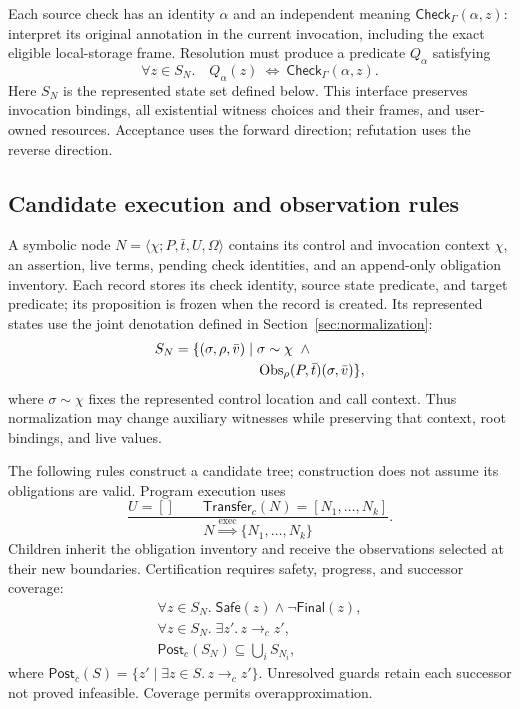 Each source check has an identity $\alpha$ and an independent meaning
$\mathsf{Check}_\Gamma(\alpha,z)$: interpret its original annotation in the
current invocation, including the exact eligible local-storage frame.
Resolution must produce a predicate $Q_\alpha$ satisfying
\begin{equation}
\label{eq:resolution}
 \forall z\in S_N.\quad
 Q_\alpha(z)\ \Longleftrightarrow\ \mathsf{Check}_\Gamma(\alpha,z).
\end{equation}
Here $S_N$ is the represented state set defined below. This interface
preserves invocation bindings, all existential witness choices and their
frames, and user-owned resources. Acceptance uses the forward direction;
refutation uses the reverse direction.

\subsection{Candidate execution and observation rules}
A symbolic node $N=\langle\chi;P,\bar t,U,\Omega\rangle$ contains its control and invocation context $\chi$, an assertion,
live terms, pending check identities, and an append-only obligation inventory. Each record stores its check identity, source state predicate, and target predicate; its proposition is frozen when the record is created.
Its represented states use the joint denotation defined in
Section~\ref{sec:normalization}:
\[
\begin{split}
 S_N=\{(\sigma,\rho,\bar v)\mid {}&\sigma\sim\chi\ \land\ {}\\
             &\operatorname{Obs}_\rho(P,\bar t)(\sigma,\bar v)\},
\end{split}
\]
where $\sigma\sim\chi$ fixes the represented control location and call
context. Thus normalization may change auxiliary witnesses while preserving
that context, root bindings, and live values.

The following rules construct a candidate tree; construction does not
assume its obligations are valid. Program execution uses
\[
\frac{U=[]\qquad
      \mathsf{Transfer}_c(N)=[N_1,\ldots,N_k]}
     {N\overset{\mathrm{exec}}{\Longrightarrow}\{N_1,\ldots,N_k\}} .
\]
Children inherit the obligation inventory and receive the observations
selected at their new boundaries.
Certification requires safety, progress, and successor coverage:
\begin{equation}
\label{eq:coverage}
\begin{gathered}
 \forall z\in S_N.\;
       \mathsf{Safe}(z)\land\neg\mathsf{Final}(z),\\
 \forall z\in S_N.\;\exists z'.\,z\to_c z',\\
 \mathsf{Post}_c(S_N)\subseteq\bigcup_i S_{N_i},
\end{gathered}
\end{equation}
where $\mathsf{Post}_c(S)=\{z'\mid\exists z\in S.\,z\to_c z'\}$.
Unresolved guards retain each successor not proved infeasible.
Coverage permits overapproximation.


